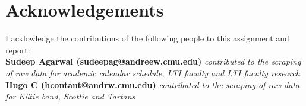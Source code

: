 \documentclass[11pt]{article}
\begin{document}
\clearpage
\section*{Acknowledgements}
I acklowledge the contributions of the following people to this assignment and report:
\\
\textbf{Sudeep Agarwal (sudeepag@andreew.cmu.edu)} \textit{contributed to the scraping of raw data for academic calendar schedule, LTI faculty and LTI faculty research}
\\
\textbf{Hugo C (hcontant@andrw.cmu.edu)} \textit{contributed to the scraping of raw data for Kiltie band, Scottie and Tartans}


\end{document}
